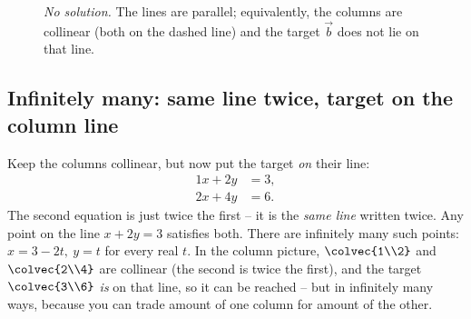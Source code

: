 \begin{figure}[H]
\centering
{}
\caption{\emph{No solution.} The lines are parallel; equivalently, the
columns are collinear (both on the dashed line) and the target $\vec b$ does
not lie on that line.}
\label{ch06:none}
\end{figure}

\subsection{Infinitely many: same line twice, target on the column line}

Keep the columns collinear, but now put the target \emph{on} their line:
\begin{equation}
  \label{ch06:infsol}
  \begin{aligned}
    1x + 2y &= 3,\\
    2x + 4y &= 6.
  \end{aligned}
\end{equation}
The second equation is just twice the first -- it is the \emph{same line}
written twice. Any point on the line $x+2y=3$ satisfies both. There are
infinitely many such points: $x=3-2t,\ y=t$ for every real $t$. In the
column picture, $\colvec{1\\2}$ and $\colvec{2\\4}$ are collinear (the second
is twice the first), and the target $\colvec{3\\6}$ \emph{is} on that line,
so it can be reached -- but in infinitely many ways, because you can trade
amount of one column for amount of the other.


